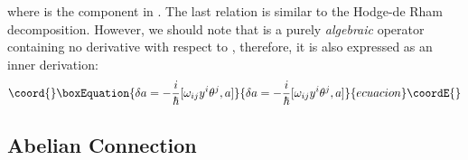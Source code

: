 \documentclass[10pt,a4paper]{article}
\def\h{\hbar}
\begin{document}
where \coordHE{} is the \coordHE{} component in \coordHE{}. The last relation is similar to the Hodge-de Rham decomposition.
However, we should note that \myHighlight{$\delta$}\coordHE{} is a purely {\it algebraic} operator containing no derivative with respect to \coordHE{}, therefore, it is also expressed as an inner derivation:
\begin{equation}\coord{}\boxEquation{
\delta a=-{i\over\h}[\omega_{ij}y^i\theta^j,a]
}{
\delta a=-{i\over\h}[\omega_{ij}y^i\theta^j,a]
}{ecuacion}\coordE{}\end{equation}


\subsection{Abelian Connection
\label{sec:abcon}}
\end{document}
